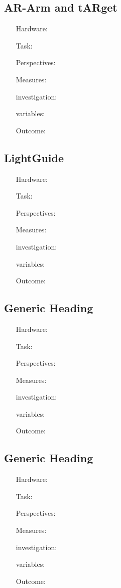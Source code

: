 \subsection{AR-Arm and tARget}
\begin{itemize}
	\item[Hardware:] 
	\item[Task:] 
	\item[Perspectives:] 
	\item[Measures:] 
	\item[investigation:] 
	\item[variables:] 
	\item[Outcome:] 
\end{itemize}

\subsection{LightGuide}
\begin{itemize}
	\item[Hardware:] 
	\item[Task:] 
	\item[Perspectives:] 
	\item[Measures:] 
	\item[investigation:] 
	\item[variables:] 
	\item[Outcome:] 
\end{itemize}

\subsection{Generic Heading}
\begin{itemize}
	\item[Hardware:] 
	\item[Task:] 
	\item[Perspectives:] 
	\item[Measures:] 
	\item[investigation:] 
	\item[variables:] 
	\item[Outcome:] 
\end{itemize}

\subsection{Generic Heading}
\begin{itemize}
	\item[Hardware:] 
	\item[Task:] 
	\item[Perspectives:] 
	\item[Measures:] 
	\item[investigation:] 
	\item[variables:] 
	\item[Outcome:] 
\end{itemize}

